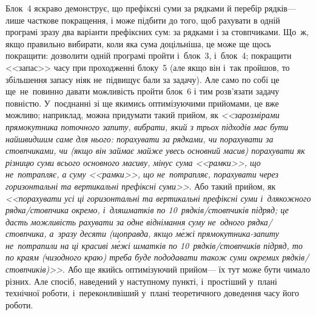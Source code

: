Блок~4 яскраво демонструє, що префіксні суми за рядками й перебір рядків\nolinebreak[3] --- лише часткове покращення, і може підбити до того, щоб рахувати в одній програмі зразу два варіанти префіксних сум: за рядками і за стовпчиками. Що~ж, якщо правильно вибирати, коли яка сума доцільніша, це може ще щось покращити: дозволити одній програмі пройти і~блок~3, і~блок~4; покращити <<запас>> часу при проходженні блоку~5 (але якщо він і~так пройшов, то збільшення запасу ніяк не~підвищує бали за задачу). Але само по собі це ще~не~повинно давати можливість пройти блок~6 і тим розв'язати задачу повністю. 
%
У~поєднанні зі ще якимись оптимізуючими прийомами, це вже можливо; наприклад, можна придумати такий прийом, як \textsl{<<за\nolinebreak[3] розмірами прямокутника поточного запиту, вибрати, який з трьох підходів має бути найшвидшим саме для нього: порахувати за рядками, чи порахувати за стовпчиками, чи (якщо він займає майже увесь основний масив) порахувати як різницю суми всього основного масиву, мінус сума <<рамки>>, що не~потрапляє, а суму <<рамки>>, що не~потрапляє, порахувати через горизонтальні та вертикальні префіксні суми>>}. Або такий прийом, як \textsl{<<порахувати усі ці горизонтальні та вертикальні префіксні суми і~для\nolinebreak[3] кожного рядка/\nolinebreak[2]стовп\-чика окремо, і~для\nolinebreak[3] шматків по 10~рядків/\nolinebreak[2]стовп\-чиків підряд; це дасть можливість рахувати за одне віднімання суму не~одного рядка/\nolinebreak[2]стовп\-чика, а~зразу десяти (щоправда, якщо м\'{е}жі прямокутника-запиту не~потрапили на ці красиві м\'{е}жі шматків по 10~рядків/\nolinebreak[2]стовп\-чиків підряд, то по краям (чи\nolinebreak[3] з\nolinebreak[3] одного краю) треба буде пододавати також суми окремих рядків/\nolinebreak[2]стовп\-чиків)>>}. Або ще якийсь оптимізуючий прийом\nolinebreak[3] --- їх тут може бути чимало різних. Але спосіб, наведений у наступному пункті, і~простіший у~плані технічної роботи, і~переконливіший у~плані теоретичного доведення часу його роботи.

